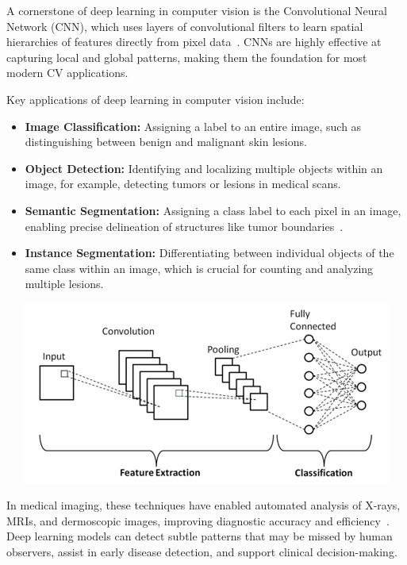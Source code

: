 \documentclass[a4paper,12pt]{report}
\begin{document}
\begin{spacing}{1.5}
    A cornerstone of deep learning in computer vision is the Convolutional Neural Network (CNN), which uses layers of convolutional filters to learn spatial hierarchies of features directly from pixel data~\cite{dl3}. CNNs are highly effective at capturing local and global patterns, making them the foundation for most modern CV applications.

    Key applications of deep learning in computer vision include:
    \begin{itemize}
        \item \textbf{Image Classification:} Assigning a label to an entire image, such as distinguishing between benign and malignant skin lesions.
        \item \textbf{Object Detection:} Identifying and localizing multiple objects within an image, for example, detecting tumors or lesions in medical scans.
        \item \textbf{Semantic Segmentation:} Assigning a class label to each pixel in an image, enabling precise delineation of structures like tumor boundaries~\cite{dl4}.
        \item \textbf{Instance Segmentation:} Differentiating between individual objects of the same class within an image, which is crucial for counting and analyzing multiple lesions.
    \end{itemize}

    \vspace{0.5cm}
    \begin{center}
        \includegraphics[width=14cm, height=6cm]{Pics/cnn1.png}
    \end{center}
    \newpage
    In medical imaging, these techniques have enabled automated analysis of X-rays, MRIs, and dermoscopic images, improving diagnostic accuracy and efficiency~\cite{dl5}. Deep learning models can detect subtle patterns that may be missed by human observers, assist in early disease detection, and support clinical decision-making.


\end{spacing}
\end{document}
